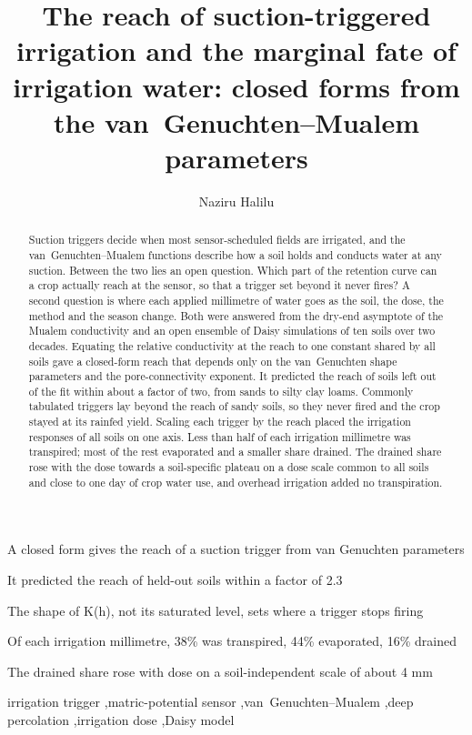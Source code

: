 \documentclass[review,12pt,authoryear]{elsarticle}
\begin{document}
\begin{frontmatter}
\title{The reach of suction-triggered irrigation and the marginal fate of irrigation water: closed forms from the van~Genuchten--Mualem parameters}

\author[aua,upna]{Naziru Halilu}

\begin{abstract}
Suction triggers decide when most sensor-scheduled fields are irrigated, and the van~Genuchten--Mualem functions describe how a soil holds and conducts water at any suction. Between the two lies an open question. Which part of the retention curve can a crop actually reach at the sensor, so that a trigger set beyond it never fires? A second question is where each applied millimetre of water goes as the soil, the dose, the method and the season change. Both were answered from the dry-end asymptote of the Mualem conductivity and an open ensemble of Daisy simulations of ten soils over two decades. Equating the relative conductivity at the reach to one constant shared by all soils gave a closed-form reach that depends only on the van~Genuchten shape parameters and the pore-connectivity exponent. It predicted the reach of soils left out of the fit within about a factor of two, from sands to silty clay loams. Commonly tabulated triggers lay beyond the reach of sandy soils, so they never fired and the crop stayed at its rainfed yield. Scaling each trigger by the reach placed the irrigation responses of all soils on one axis. Less than half of each irrigation millimetre was transpired; most of the rest evaporated and a smaller share drained. The drained share rose with the dose towards a soil-specific plateau on a dose scale common to all soils and close to one day of crop water use, and overhead irrigation added no transpiration.
\end{abstract}

\begin{highlights}
\item A closed form gives the reach of a suction trigger from van Genuchten parameters
\item It predicted the reach of held-out soils within a factor of 2.3
\item The shape of K(h), not its saturated level, sets where a trigger stops firing
\item Of each irrigation millimetre, 38\% was transpired, 44\% evaporated, 16\% drained
\item The drained share rose with dose on a soil-independent scale of about 4 mm
\end{highlights}

\begin{keyword}
irrigation trigger \sep matric-potential sensor \sep van~Genuchten--Mualem \sep deep percolation \sep irrigation dose \sep Daisy model
\end{keyword}
\end{frontmatter}
\end{document}
